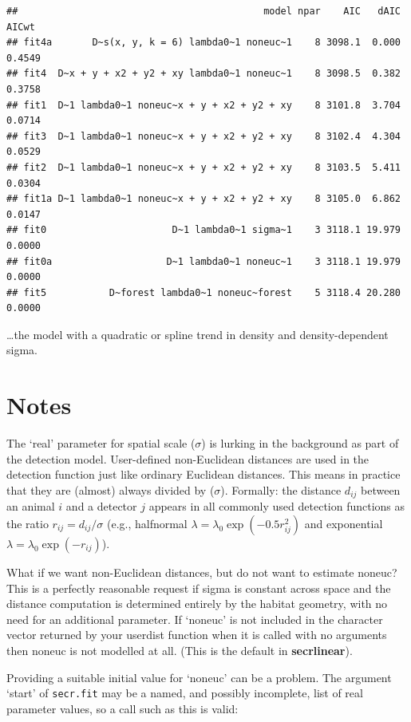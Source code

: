 \documentclass[
]{book}
\begin{document}
\begin{verbatim}
##                                           model npar    AIC   dAIC  AICwt
## fit4a       D~s(x, y, k = 6) lambda0~1 noneuc~1    8 3098.1  0.000 0.4549
## fit4  D~x + y + x2 + y2 + xy lambda0~1 noneuc~1    8 3098.5  0.382 0.3758
## fit1  D~1 lambda0~1 noneuc~x + y + x2 + y2 + xy    8 3101.8  3.704 0.0714
## fit3  D~1 lambda0~1 noneuc~x + y + x2 + y2 + xy    8 3102.4  4.304 0.0529
## fit2  D~1 lambda0~1 noneuc~x + y + x2 + y2 + xy    8 3103.5  5.411 0.0304
## fit1a D~1 lambda0~1 noneuc~x + y + x2 + y2 + xy    8 3105.0  6.862 0.0147
## fit0                      D~1 lambda0~1 sigma~1    3 3118.1 19.979 0.0000
## fit0a                    D~1 lambda0~1 noneuc~1    3 3118.1 19.979 0.0000
## fit5           D~forest lambda0~1 noneuc~forest    5 3118.4 20.280 0.0000
\end{verbatim}

\ldots the model with a quadratic or spline trend in density and density-dependent sigma.

\section{Notes}\label{notes-1}

The `real' parameter for spatial scale (\(\sigma\)) is lurking in the background as part of the detection model. User-defined non-Euclidean distances are used in the detection function just like ordinary Euclidean distances. This means in practice that they are (almost) always divided by (\(\sigma\)). Formally: the distance \(d_{ij}\) between an animal \(i\) and a detector \(j\) appears in all commonly used detection functions as the ratio \(r_{ij} = d_{ij}/\sigma\) (e.g., halfnormal \(\lambda = \lambda_0 \exp(-0.5r_{ij}^2)\) and exponential \(\lambda = \lambda_0 \exp(-r_{ij})\)).

What if we want non-Euclidean distances, but do not want to estimate noneuc? This is a perfectly reasonable request if sigma is constant across space and the distance computation is determined entirely by the habitat geometry, with no need for an additional parameter. If `noneuc' is not included in the character vector returned by your userdist function when it is called with no arguments then noneuc is not modelled at all. (This is the default in \textbf{secrlinear}).

Providing a suitable initial value for `noneuc' can be a problem. The argument `start' of \texttt{secr.fit} may be a named, and possibly incomplete, list of real parameter values, so a call such as this is valid:
\end{document}
